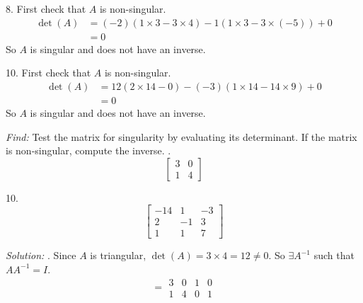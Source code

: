 \documentclass[11pt]{homework}
\begin{document}
8. First check that $A$ is non-singular.
\begin{align*}
  \det (A) &= (-2) (1 \times 3 - 3 \times 4) 
            - 1    (1 \times 3 - 3 \times (-5))
            + 0 \\
           &= 0
\end{align*}
So $A$ is singular and does not have an inverse.

10. First check that $A$ is non-singular.
\begin{align*}
  \det (A) &= 12 (2 \times 14 - 0)
            -(-3)(1 \times 14 - 14 \times 9)
            + 0 \\
           &= 0
\end{align*}
So $A$ is singular and does not have an inverse.

\question
\emph{Find:}
\newline
Test the matrix for singularity by evaluating its determinant.
If the matrix is non-singular, compute the inverse.
.
\begin{equation*}
  \begin{bmatrix}
  3 & 0 \\
  1 & 4 
  \end{bmatrix}
\end{equation*}

10.
\begin{equation*}
  \begin{bmatrix}
  -14 & 1 & -3 \\
  2  & -1 & 3 \\
  1 & 1 & 7 
  \end{bmatrix}
\end{equation*}

\emph{Solution:}
. Since $A$ is triangular, $\det(A) = 3 \times 4 = 12 \neq 0$. 
So $\exists A^{-1}$ such that $AA^{-1} = I$.
\begin{equation*}
[A|I] =
  \begin{array}{cc|cc}
  3 & 0 & 1 & 0 \\
  1 & 4 & 0 & 1
  \end{array} 
\end{equation*}
\end{document}
